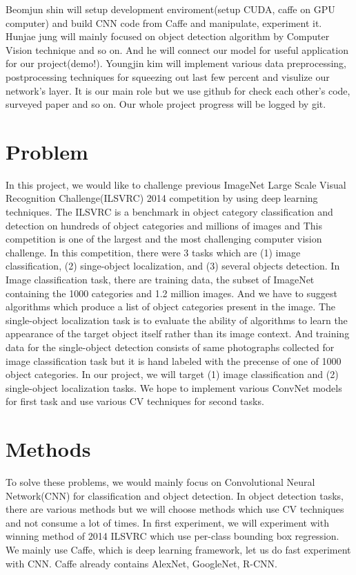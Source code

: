 \documentclass[10pt,twocolumn,letterpaper]{article}
\begin{document}
Beomjun shin will setup development enviroment(setup CUDA, caffe on GPU computer) and build CNN code from Caffe and manipulate, experiment it.
Hunjae jung will mainly focused on object detection algorithm by Computer Vision technique and so on.
And he will connect our model for useful application for our project(demo!).
Youngjin kim will implement various data preprocessing, postprocessing techniques for squeezing out last few percent and visulize our network's layer.
It is our main role but we use github for check each other's code, surveyed paper and so on.
Our whole project progress will be logged by git.

\section{Problem}

In this project, we would like to challenge previous ImageNet Large Scale Visual Recognition Challenge(ILSVRC) 2014 competition by using deep learning techniques.
The ILSVRC is a benchmark in object category classification and detection on hundreds of object categories and millions of images and This competition is one of the largest and the most challenging computer vision challenge.
In this competition, there were 3 tasks which are (1) image classification, (2) singe-object localization, and (3) several objects detection.
In Image classification task, there are training data, the subset of ImageNet containing the 1000 categories and 1.2 million images.
And we have to suggest algorithms which produce a list of object categories present in the image.
The single-object localization task is to evaluate the ability of algorithms to learn the appearance of the target object itself rather than its image context.
And training data for the single-object detection consists of same photographs collected for image classification task but it is hand labeled with the precense of one of 1000 object categories.
In our project, we will target (1) image classification and (2) single-object localization tasks.
We hope to implement various ConvNet models for first task and use various CV techniques for second tasks.

\section{Methods}

To solve these problems, we would mainly focus on Convolutional Neural Network(CNN) for classification and object detection.
In object detection tasks, there are various methods but we will choose methods which use CV techniques and not consume a lot of times.
In first experiment, we will experiment with winning method of 2014 ILSVRC which use per-class bounding box regression.
We mainly use Caffe, which is deep learning framework, let us do fast experiment with CNN.
Caffe already contains AlexNet, GoogleNet, R-CNN.
\end{document}
